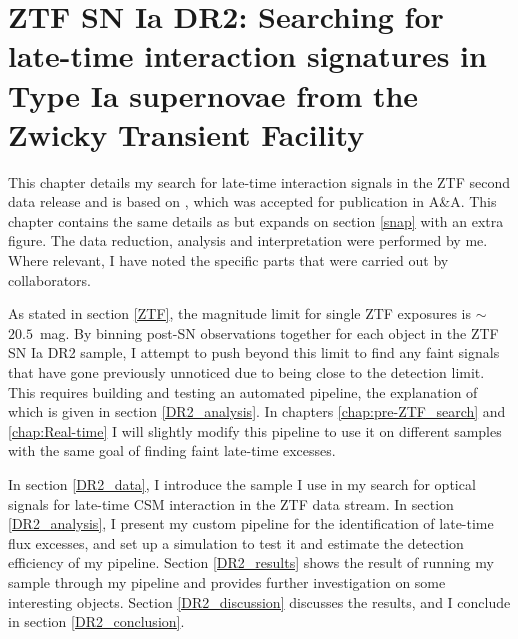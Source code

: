 \documentclass[a4paper,oneside,12pt, class=Latex/Classes/PhDthesisPSnPDF, crop=false]{standalone}
\begin{document}
\doublespacing
\chapter{ZTF SN Ia DR2: Searching for late-time interaction signatures in Type Ia supernovae from the Zwicky Transient Facility}
\label{chap:DR2_search}
This chapter details my search for late-time interaction signals in the ZTF second data release \citep[ZTF SN Ia DR2,][Smith et al., in prep.]{DR2_Overview} and is based on \citet{Terwel_2024_paper1}, which was accepted for publication in A\&A. This chapter contains the same details as \citet{Terwel_2024_paper1} but expands on section \ref{snap} with an extra figure. The data reduction, analysis and interpretation were performed by me. Where relevant, I have noted the specific parts that were carried out by collaborators.

As stated in section \ref{ZTF}, the magnitude limit for single ZTF exposures is $\sim$~$20.5$~mag. By binning post-SN observations together for each object in the ZTF SN Ia DR2 sample, I attempt to push beyond this limit to find any faint signals that have gone previously unnoticed due to being close to the detection limit. This requires building and testing an automated pipeline, the explanation of which is given in section \ref{DR2_analysis}. In chapters \ref{chap:pre-ZTF_search} and \ref{chap:Real-time} I will slightly modify this pipeline to use it on different samples with the same goal of finding faint late-time excesses.

In section \ref{DR2_data}, I introduce the sample I use in my search for optical signals for late-time CSM interaction in the ZTF data stream. In section \ref{DR2_analysis}, I present my custom pipeline for the identification of late-time flux excesses, and set up a simulation to test it and estimate the detection efficiency of my pipeline. Section \ref{DR2_results} shows the result of running my sample through my pipeline and provides further investigation on some interesting objects. Section \ref{DR2_discussion} discusses the results, and I conclude in section \ref{DR2_conclusion}.
\end{document}
